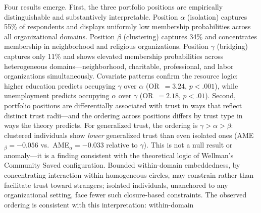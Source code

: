 Four results emerge. First, the three portfolio positions are empirically distinguishable and substantively interpretable. Position $\alpha$ (isolation) captures 55\% of respondents and displays uniformly low membership probabilities across all organizational domains. Position $\beta$ (clustering) captures 34\% and concentrates membership in neighborhood and religious organizations. Position $\gamma$ (bridging) captures only 11\% and shows elevated membership probabilities across heterogeneous domains---neighborhood, charitable, professional, and labor organizations simultaneously. Covariate patterns confirm the resource logic: higher education predicts occupying $\gamma$ over $\alpha$ (OR~$= 3.24$, $p < .001$), while unemployment predicts occupying $\alpha$ over $\gamma$ (OR~$= 2.18$, $p < .01$). Second, portfolio positions are differentially associated with trust in ways that reflect distinct trust radii---and the ordering across positions differs by trust type in ways the theory predicts. For generalized trust, the ordering is $\gamma > \alpha > \beta$: clustered individuals show \textit{lower} generalized trust than even isolated ones (AME$_\beta = -0.056$ vs.\ AME$_\alpha = -0.033$ relative to $\gamma$). This is not a null result or anomaly---it is a finding consistent with the theoretical logic of Wellman's Community Saved configuration. Bounded within-domain embeddedness, by concentrating interaction within homogeneous circles, may constrain rather than facilitate trust toward strangers; isolated individuals, unanchored to any organizational setting, face fewer such closure-based constraints. The observed ordering is consistent with this interpretation: within-domain
